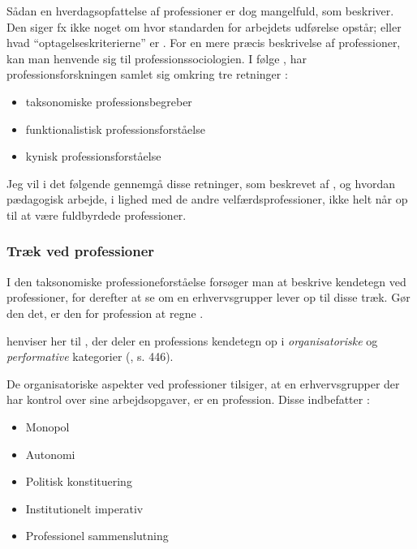 Sådan en hverdagsopfattelse af professioner er dog mangelfuld, som \citeauthor{frederiksenVelfaerdsprofessionerMellemOmsorg2017} beskriver. Den siger fx ikke noget om hvor standarden for arbejdets udførelse opstår; eller hvad “optagelseskriterierne” er \autocite[s. 445]{frederiksenVelfaerdsprofessionerMellemOmsorg2017}.
For en mere præcis beskrivelse af professioner, kan man henvende sig til professionssociologien. I følge \citeauthor{frederiksenVelfaerdsprofessionerMellemOmsorg2017}, har professionsforskningen samlet sig omkring tre retninger \autocite[s. 445]{frederiksenVelfaerdsprofessionerMellemOmsorg2017}:
\begin{itemize}
  \item
    taksonomiske professionsbegreber
  \item
    funktionalistisk professionsforståelse
  \item
    kynisk professionsforståelse
\end{itemize}

Jeg vil i det følgende gennemgå disse retninger, som beskrevet af \citeauthor{frederiksenVelfaerdsprofessionerMellemOmsorg2017}, og hvordan pædagogisk arbejde, i lighed med de andre velfærdsprofessioner, ikke helt når op til at være fuldbyrdede professioner.

\subsubsection{Træk ved professioner}
I den taksonomiske professioneforståelse forsøger man at beskrive kendetegn ved professioner, for derefter at se om en erhvervsgrupper lever op til disse træk.
Gør den det, er den for profession at regne \autocite[s.446]{frederiksenVelfaerdsprofessionerMellemOmsorg2017}.

\citeauthor{frederiksenVelfaerdsprofessionerMellemOmsorg2017} henviser her til \citeauthor{molanderProfesjonsstudierIntroduksjon2008}, der deler en professions kendetegn op i \textit{organisatoriske} og \textit{performative} kategorier (\citeyear{frederiksenVelfaerdsprofessionerMellemOmsorg2017}, s. 446).

De organisatoriske aspekter ved professioner tilsiger, at en erhvervsgrupper der har kontrol over sine arbejdsopgaver, er en profession. Disse indbefatter \autocite[s. 18ff]{molanderProfesjonsstudierIntroduksjon2008}:
\begin{itemize}
  \item
    Monopol
  \item
    Autonomi
  \item
    Politisk konstituering
  \item
    Institutionelt imperativ
  \item
    Professionel sammenslutning
\end{itemize}

